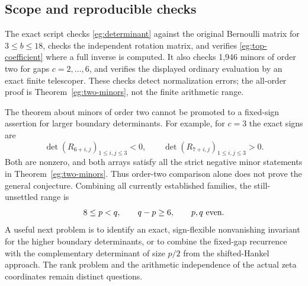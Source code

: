 \subsection{Scope and reproducible checks}

The exact script checks \eqref{eg:determinant} against the original
Bernoulli matrix for $3\le b\le18$, checks the independent rotation
matrix, and verifies \eqref{eg:top-coefficient} where a full inverse
is computed. It also checks 1,946 minors of order two for gaps
$c=2,\ldots,6$, and verifies the displayed ordinary evaluation by
an exact finite telescoper. These checks detect normalization errors;
the all-order proof is Theorem~\ref{eg:two-minors}, not the finite
arithmetic range.

The theorem about minors of order two cannot be promoted to a
fixed-sign assertion for larger boundary determinants. For example,
for $c=3$ the exact signs are
\[
 \det(R_{6+i,j})_{1\le i,j\le3}<0,\qquad
 \det(R_{7+i,j})_{1\le i,j\le3}>0.
\]
Both are nonzero, and both arrays satisfy all the strict negative
minor statements in Theorem~\ref{eg:two-minors}. Thus order-two
comparison alone does not prove the general conjecture. Combining
all currently established families, the still-unsettled range is
\[
             8\le p<q,\qquad q-p\ge6,
             \qquad p,q\ \hbox{even}.
\]
A useful next problem is to identify an exact, sign-flexible
nonvanishing invariant for the higher boundary determinants, or to
combine the fixed-gap recurrence with the complementary determinant
of size $p/2$ from the shifted-Hankel approach. The rank problem and
the arithmetic independence of the actual zeta coordinates remain
distinct questions.
